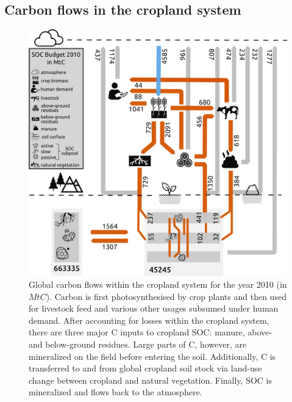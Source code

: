 \documentclass[gc, manuscript]{copernicus}
\begin{document}
\hypertarget{carbon-flows-in-the-cropland-system}{%
\subsection{Carbon flows in the cropland system}\label{carbon-flows-in-the-cropland-system}}

\begin{figure}[h]
\includegraphics[width=16cm]{../ResultNotebooks/Output/Images/CarbonBudget} \caption{Global carbon flows within the cropland system for the year 2010 (in $\unit{MtC}$). Carbon is first photosynthesised by crop plants and then used for livestock feed and various other usages subsumed under human demand. After accounting for losses within the cropland system, there are three major C inputs to cropland SOC: manure, above- and below-ground residues. Large parts of C, however, are mineralized on the field before entering the soil. Additionally, C is transferred to and from global cropland soil stock via land-use change between cropland and natural vegetation. Finally, SOC is mineralized and flows back to the atmosphere.}\label{fig:FlowFig}
\end{figure}
\end{document}
